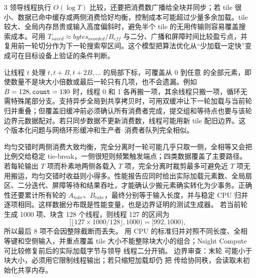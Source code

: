 \begin{solutionexercise}{3}
领导线程执行 $O(\!\log T)$ 比较，还要把消费数广播给全块并同步；若 tile 很小、数据已命中缓存或两侧消费恰好均衡，控制成本可能超过少量多余加载。tile 较大、全局内存昂贵或输入高度偏斜时，避免半个 tile 的无用传输则容易覆盖搜索成本。可用 $T_{saved}\approx bytes_{avoided}/B_{eff}$ 与二分、广播和屏障时间比较盈亏点，并复用前一轮切分作为下一轮搜索窄区间。这个模型把算法优化从“少加载一定快”变成可在目标设备上验证的条件判断。

让线程 $t$ 处理 $t,t+B,t+2B,\ldots$ 的局部下标，可覆盖从 0 到任意  的全部元素，即使数量不是块大小倍数或最后一轮只有几项，也不会遗漏。例如 $B=128,\code{count}=130$ 时，线程 0 和 1 各再搬一项，其余线程只搬一项，循环无需特殊尾部分支。支持异步全局到共享拷贝时，可用双缓冲让下一轮加载与当前轮归并重叠；但覆盖旧缓冲前必须确认所有消费者完成，提交组和等待点也要与该轮边界元数据配对。若只同步数据不更新消费数，线程可能用新 tile 配旧边界。这个版本化问题与网络环形缓冲和生产者--消费者队列完全相似。

均匀交错时两侧消费大致均衡，完全分离时一轮可能几乎只取一侧，全相等又会把比例交给稳定 tie-break，一侧很短则频繁触发端点；四类数据覆盖了主要路径。若每轮输出 $T$ 项而朴素地两侧各载入 $T$ 项，完全分离时裁剪最多可避免近 $T$ 项无用搬运，均匀交错时收益则小得多。性能报告应同时给出实际加载元素数、全局扇区、二分迭代、屏障等待和结果吞吐，才能确认少搬元素确实转化为少事务。正确性还要累计所有轮的 $A_{take}$、$B_{take}$，最终分别等于输入长度，并与稳定 CPU 归并逐项相同。这样数据分布既是性能变量，也是边界证明的测试生成器。
\variantheading 若当前轮生成 1000 项、块含 128 个线程，则线程 127 的区间为
\[
[\lfloor127\times1000/128\rfloor,1000)=[992,1000),
\]
所以最后 8 项不会因整除截断而丢失。
\practiceheading 用 CPU 的标准归并对照不同长度、全相等键和空侧输入，并重点覆盖 tile
大小不能整除块大小的组合；Nsight Compute 可比较修复前后的实际加载字节与领导
线程二分开销。
边界审查：末轮  可能小于块大小，必须用它限制线程输出；若只缩短加载却仍
把  传给协同秩，会读取未初始化共享内存。
\end{solutionexercise}

